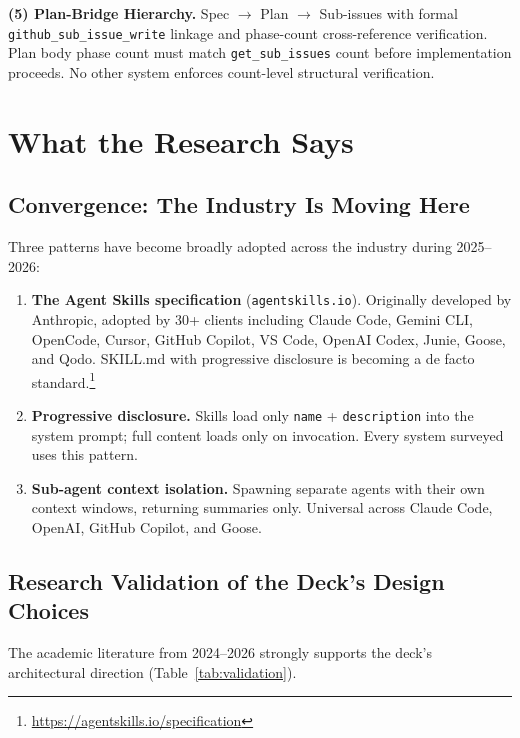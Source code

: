 \documentclass[11pt,a4paper]{article}
\begin{document}
\begin{strengthbox}
\textbf{(5) Plan-Bridge Hierarchy.}  Spec $\to$ Plan $\to$ Sub-issues with formal \texttt{github\_sub\_issue\_write} linkage and phase-count cross-reference verification.  Plan body phase count must match \texttt{get\_sub\_issues} count before implementation proceeds.  No other system enforces count-level structural verification.
\end{strengthbox}

\newpage

\section{What the Research Says}

\subsection{Convergence: The Industry Is Moving Here}

Three patterns have become broadly adopted across the industry during 2025--2026:

\begin{enumerate}[leftmargin=*]
  \item \textbf{The Agent Skills specification} (\texttt{agentskills.io}).  Originally developed by Anthropic, adopted by 30+ clients including Claude Code, Gemini CLI, OpenCode, Cursor, GitHub Copilot, VS Code, OpenAI Codex, Junie, Goose, and Qodo.  SKILL.md with progressive disclosure is becoming a de facto standard.\footnote{\url{https://agentskills.io/specification}}
  \item \textbf{Progressive disclosure.}  Skills load only \texttt{name} + \texttt{description} into the system prompt; full content loads only on invocation.  Every system surveyed uses this pattern.
  \item \textbf{Sub-agent context isolation.}  Spawning separate agents with their own context windows, returning summaries only.  Universal across Claude Code, OpenAI, GitHub Copilot, and Goose.
\end{enumerate}

\subsection{Research Validation of the Deck's Design Choices}

The academic literature from 2024--2026 strongly supports the deck's architectural direction (Table~\ref{tab:validation}).
\end{document}
